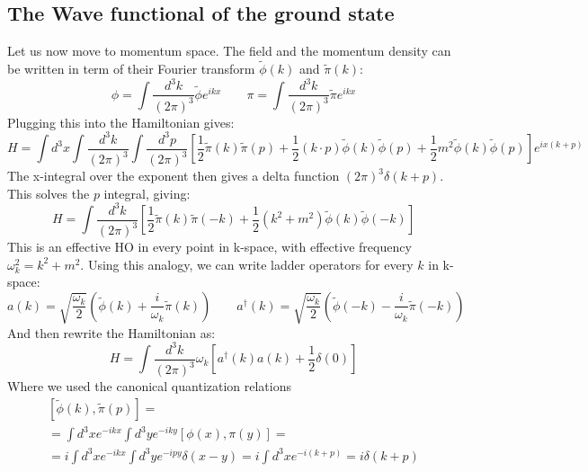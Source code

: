 \documentclass{article}
\begin{document}
\subsection{The Wave functional of the ground state}
Let us now move to momentum space. The field and the momentum density can be written in term of their Fourier transform $\tilde{\phi}(k)$ and $\tilde{\pi}(k)$:
\begin{equation}
    \phi = \int \frac{d^3k}{(2\pi)^3} \tilde{\phi} e^{ikx}
    \qquad
    \pi = \int \frac{d^3k}{(2\pi)^3} \tilde{\pi} e^{ikx}
\end{equation}
Plugging this into the Hamiltonian gives:
\begin{equation}
    H = \int d^3x \int \frac{d^3k}{(2\pi)^3} \int \frac{d^3p}{(2\pi)^3} \left[
        \frac{1}{2}\tilde{\pi}(k)\tilde{\pi}(p) + \frac{1}{2}(k \cdot p)\tilde{\phi}(k)\tilde{\phi}(p) + \frac{1}{2}m^2\tilde{\phi}(k)\tilde{\phi}(p)
    \right]e^{ix(k + p)}
\end{equation}
The x-integral over the exponent then gives a delta function $(2\pi)^3 \delta(k+p)$. This solves the $p$ integral, giving:
\begin{equation}
    H = \int \frac{d^3k}{(2\pi)^3} \left[
        \frac{1}{2}\tilde{\pi}(k)\tilde{\pi}(-k) + \frac{1}{2}\left(k^2 + m^2\right)\tilde{\phi}(k)\tilde{\phi}(-k)
    \right]
\end{equation}
This is an effective HO in every point in k-space, with effective frequency $\omega_k^2 = k^2 + m^2$. Using this analogy, we can write ladder operators for every $k$ in k-space:
\begin{equation}
    a(k) = \sqrt{\frac{\omega_k}{2}}\left(\tilde{\phi}(k) + \frac{i}{\omega_k}\tilde{\pi}(k)\right)
    \qquad
    a^\dagger(k) = \sqrt{\frac{\omega_k}{2}}\left(\tilde{\phi}(-k) - \frac{i}{\omega_k}\tilde{\pi}(-k)\right)
\end{equation}
And then rewrite the Hamiltonian as:
\begin{equation}
    H = \int \frac{d^3k}{(2\pi)^3} \omega_k \left[a^\dagger(k)a(k) + \frac{1}{2}
    \delta(0)\right]
\end{equation}
Where we used the canonical quantization relations
\begin{equation}
\begin{gathered}
    \left[\tilde{\phi}(k), \tilde{\pi}(p)\right] = \\ =
    \int d^3x e^{-ikx} \int d^3y e^{-iky} \left[\phi(x), \pi(y)\right] = \\ =
    i\int d^3x e^{-ikx} \int d^3y e^{-ipy} \delta(x - y) = i\int d^3x e^{-i(k + p)} = i\delta(k + p)
\end{gathered}
\end{equation}
\end{document}
